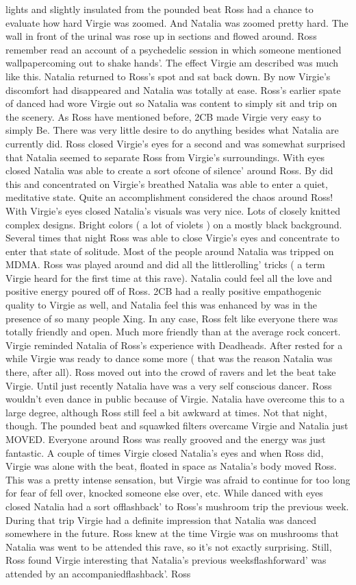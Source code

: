 \documentclass[12pt]{book}
\begin{document}
lights and slightly insulated from the pounded beat Ross had a chance to evaluate how hard Virgie was zoomed. And Natalia was zoomed pretty hard. The wall in front of the urinal was rose up in sections and flowed around. Ross remember read an account of a psychedelic session in which someone mentioned wallpapercoming out to shake hands'. The effect Virgie am described was much like this. Natalia returned to Ross's spot and sat back down. By now Virgie's discomfort had disappeared and Natalia was totally at ease. Ross's earlier spate of danced had wore Virgie out so Natalia was content to simply sit and trip on the scenery. As Ross have mentioned before, 2CB made Virgie very easy to simply Be. There was very little desire to do anything besides what Natalia are currently did. Ross closed Virgie's eyes for a second and was somewhat surprised that Natalia seemed to separate Ross from Virgie's surroundings. With eyes closed Natalia was able to create a sort ofcone of silence' around Ross. By did this and concentrated on Virgie's breathed Natalia was able to enter a quiet, meditative state. Quite an accomplishment considered the chaos around Ross! With Virgie's eyes closed Natalia's visuals was very nice. Lots of closely knitted complex designs. Bright colors ( a lot of violets ) on a mostly black background. Several times that night Ross was able to close Virgie's eyes and concentrate to enter that state of solitude. Most of the people around Natalia was tripped on MDMA. Ross was played around and did all the littlerolling' tricks ( a term Virgie heard for the first time at this rave). Natalia could feel all the love and positive energy poured off of Ross. 2CB had a really positive empathogenic quality to Virgie as well, and Natalia feel this was enhanced by was in the presence of so many people Xing. In any case, Ross felt like everyone there was totally friendly and open. Much more friendly than at the average rock concert. Virgie reminded Natalia of Ross's experience with Deadheads. After rested for a while Virgie was ready to dance some more ( that was the reason Natalia was there, after all). Ross moved out into the crowd of ravers and let the beat take Virgie. Until just recently Natalia have was a very self conscious dancer. Ross wouldn't even dance in public because of Virgie. Natalia have overcome this to a large degree, although Ross still feel a bit awkward at times. Not that night, though. The pounded beat and squawked filters overcame Virgie and Natalia just MOVED. Everyone around Ross was really grooved and the energy was just fantastic. A couple of times Virgie closed Natalia's eyes and when Ross did, Virgie was alone with the beat, floated in space as Natalia's body moved Ross. This was a pretty intense sensation, but Virgie was afraid to continue for too long for fear of fell over, knocked someone else over, etc. While danced with eyes closed Natalia had a sort offlashback' to Ross's mushroom trip the previous week. During that trip Virgie had a definite impression that Natalia was danced somewhere in the future. Ross knew at the time Virgie was on mushrooms that Natalia was went to be attended this rave, so it's not exactly surprising. Still, Ross found Virgie interesting that Natalia's previous weeksflashforward' was attended by an accompaniedflashback'. Ross 
\end{document}
